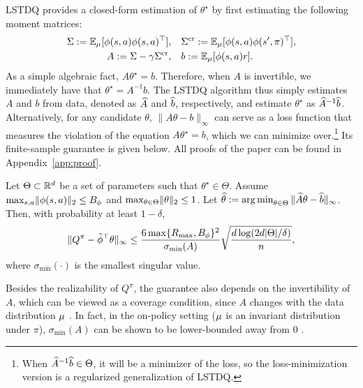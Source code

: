 LSTDQ provides a closed-form estimation of $\theta^\star$ by first estimating the following moment matrices:
\begin{align}
\Sigma := \mathbb{E}_{\mu}[\phi(s,a)\phi(s,a)^\top], 
\quad & \Sigma^{\textrm{cr}} := \mathbb{E}_{\mu}[\phi(s,a)\phi(s',\pi)^\top], \\ 
A := \Sigma - \gamma \Sigma^{\textrm{cr}}, \quad & b := \mathbb{E}_{\mu}[\phi(s,a) r]. \label{eq:lstd-a-b}
\end{align}
As a simple algebraic fact, $A \theta^\star = b$. Therefore, when $A$ is invertible, we immediately have that $\theta^\star = A^{-1} b$. The LSTDQ algorithm thus simply estimates $A$ and $b$ from data, denoted as $\widehat{A}$ and $\widehat{b}$, respectively, and estimate $\theta^\star$ as $\widehat{A}^{-1} \widehat{b}$. Alternatively, for any candidate $\theta$, $\|A \theta - b\|_\infty$ %
can serve as a loss function that measures the violation of the equation $A\theta^\star = b$, which we can minimize over.\footnote{When $\widehat{A}^{-1} \widehat{b} \in \Theta$, it will be a minimizer of the loss, so the loss-minimization version is a regularized generalization of LSTDQ.  } Its finite-sample guarantee is given below. All proofs of the paper can be found in Appendix~\ref{app:proof}.

%
%
%
%
%
%
%
%
%
%
%
%
%

\begin{theorem} \label{thm:lstd}
%
Let $\Theta \subset \mathbb{R}^d$ be a set of parameters such that $\theta^\star \in \Theta$. Assume $\max_{s,a} \lVert\phi(s,a)\rVert_2 \leq B_\phi$ and $\max_{\theta \in \Theta} \lVert\theta\rVert_2 \leq 1$. Let $\widehat{\theta} := \operatorname*{arg\,min}_{\theta\in\Theta} \|\widehat{A} \theta - \widehat{b}\|_\infty$. Then, with probability at least $1-\delta$, 
%
%
%
%
\begin{align}
\|Q^\pi - \hat{\phi}^\top \theta\|_\infty \le \frac{6\max\{R_{\max}, B_{\phi}\}^2}{\sigma_{\min}(A)}  \sqrt{\frac{d\log(2d\lvert\Theta\rvert/\delta)}{n}},
\end{align}
where $\sigma_{\min}(\cdot)$ is the smallest singular value. 
\end{theorem}

Besides the realizability of $Q^\pi$, the guarantee also depends on the invertibility of $A$, which can be viewed as a coverage condition, since $A$ changes with the data distribution $\mu$ \cite{amortila2020variant,amortila2023optimal,jiang2024offline}. In fact, in the on-policy setting ($\mu$ is an invariant distribution under  $\pi$), $\sigma_{\min}(A)$ can be shown to be lower-bounded away from $0$ \cite{mou2023optimal}. 

